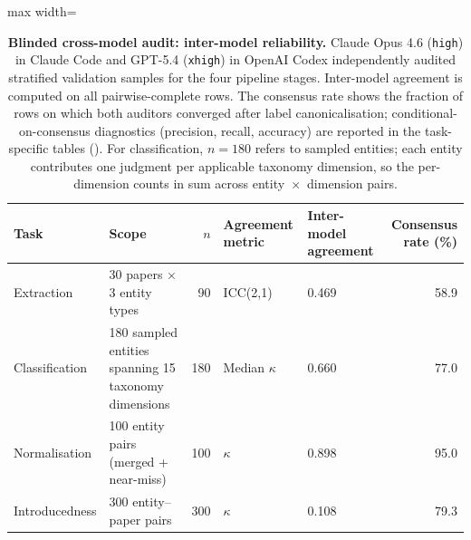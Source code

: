 \begin{table}[H]
\centering
\caption{\textbf{Blinded cross-model audit: inter-model reliability.} Claude Opus 4.6 (\texttt{high}) in Claude Code and GPT-5.4 (\texttt{xhigh}) in OpenAI Codex independently audited stratified validation samples for the four pipeline stages. Inter-model agreement is computed on all pairwise-complete rows. The consensus rate shows the fraction of rows on which both auditors converged after label canonicalisation; conditional-on-consensus diagnostics (precision, recall, accuracy) are reported in the task-specific tables (). For classification, $n = 180$ refers to sampled entities; each entity contributes one judgment per applicable taxonomy dimension, so the per-dimension counts in  sum across entity~$\times$~dimension pairs.}
\label{tab:annotation_summary}
\begin{adjustbox}{max width=\textwidth}
\footnotesize
\begin{tabular}{l l r l l r}
\toprule
Task & Scope & $n$ & Agreement metric & Inter-model agreement & Consensus rate (\%) \\
\midrule
Extraction & 30 papers $\times$ 3 entity types & 90 & ICC(2,1) & 0.469 & 58.9 \\
Classification & 180 sampled entities spanning 15 taxonomy dimensions & 180 & Median $\kappa$ & 0.660 & 77.0 \\
Normalisation & 100 entity pairs (merged + near-miss) & 100 & $\kappa$ & 0.898 & 95.0 \\
Introducedness & 300 entity--paper pairs & 300 & $\kappa$ & 0.108 & 79.3 \\
\bottomrule
\end{tabular}
\end{adjustbox}
\end{table}
